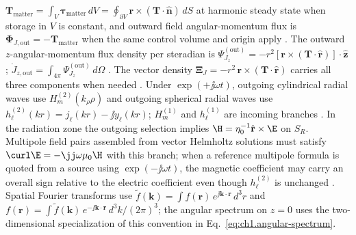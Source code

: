 $\mathbf{T}_{\mathrm{matter}}=\int_V \boldsymbol{\tau}_{\mathrm{matter}}\,dV=\oint_{\partial V}\mathbf{r}\times(\mathbf{T}\cdot\hat{\mathbf{n}})\,dS$ at harmonic steady state when storage in $V$ is constant,
and outward field angular-momentum flux is
$\boldsymbol{\Phi}_{J,\mathrm{out}}=-\mathbf{T}_{\mathrm{matter}}$
when the same control volume and origin apply \cite{stratton1941,beth1936}.
The outward $z$-angular-momentum flux density per steradian is
$\Psi_{J_z}^{\mathrm{(out)}}=-r^2[\mathbf{r}\times(\mathbf{T}\cdot\hat{\mathbf{r}})]\cdot\hat{\mathbf{z}}$;
$\dot J_{z,\mathrm{out}}=\int_{4\pi}\Psi_{J_z}^{\mathrm{(out)}}\,d\Omega$ \cite{stratton1941}.
The vector density $\boldsymbol{\Xi}_J=-r^2\,\mathbf{r}\times(\mathbf{T}\cdot\hat{\mathbf{r}})$ carries all three components when needed \cite{beth1936}.
Under $\exp(+\jj\omega t)$, outgoing cylindrical radial waves use $H_m^{(2)}(k_\rho\rho)$ and outgoing spherical radial waves use $h_\ell^{(2)}(kr)=j_\ell(kr)-\jj y_\ell(kr)$; $H_m^{(1)}$ and $h_\ell^{(1)}$ are incoming branches \cite{stratton1941,harrington2001}.
In the radiation zone the outgoing selection implies $\H=\eta_0^{-1}\hat{\mathbf{r}}\times\E$ on $S_R$.
Multipole field pairs assembled from vector Helmholtz solutions must satisfy $\curl\E=-\jj\omega\mu_0\H$ with this branch; when a reference multipole formula is quoted from a source using $\exp(-\jj\omega t)$, the magnetic coefficient may carry an overall sign relative to the electric coefficient even though $h_\ell^{(2)}$ is unchanged \cite{stratton1941,hansen1988}.
Spatial Fourier transforms use
$\tilde{f}(\mathbf{k})=\int f(\mathbf{r})\,e^{\jj\mathbf{k}\cdot\mathbf{r}}\,d^3r$
and
$f(\mathbf{r})=\int \tilde{f}(\mathbf{k})\,e^{-\jj\mathbf{k}\cdot\mathbf{r}}\,d^3k/(2\pi)^3$;
the angular spectrum on $z=0$ uses the two-dimensional specialization of this convention in Eq.~\eqref{eq:ch1.angular-spectrum}.

\noindent{}
